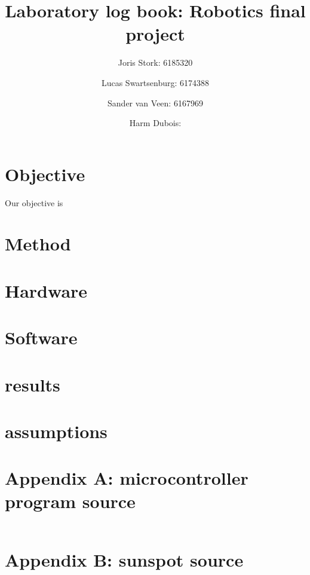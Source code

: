 \documentclass[a4paper, 12pt, titlepage]{article}
\author{Joris Stork: 6185320 \and Lucas Swartsenburg: 6174388 \and Sander van
Veen: 6167969 \and Harm Dubois: }
\title{Laboratory log book: Robotics final project}
\begin{document}
\maketitle

\section{Objective} %
Our objective is 

\section{Method} %

\section{Hardware}

\section{Software}


\section{results} %

\section{assumptions} %


\newpage
\appendix

\section{Appendix A: microcontroller program source} %
\begin{verbatim}
\end{verbatim}

\section{Appendix B: sunspot source} %

\end{document}
